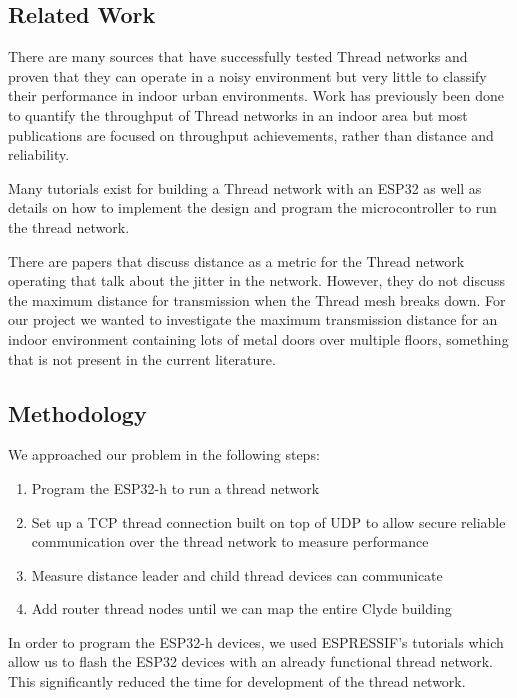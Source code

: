 \documentclass[letterpaper,twocolumn,10pt]{article}
\begin{document}
\subsection*{Related Work}

There are many sources that have successfully tested Thread networks and proven that they can operate in a noisy environment \cite*{Thread_noisy_env} but very little to classify their performance in indoor urban environments. Work has previously been done to quantify the throughput of Thread networks in an indoor area \cite*{Thread_on_drones} \cite*{Thread_lightbulb} but most publications are focused on throughput achievements, rather than distance and reliability.

Many tutorials exist for building a Thread network with an ESP32 \cite*{Thread_tutorial} as well as details on how to implement the design and program the microcontroller \cite*{Thread_tutorial_2} to run the thread network.  

There are papers that discuss distance as a metric for the Thread network operating \cite*{Thread_wheelchair} that talk about the jitter in the network. However, they do not discuss the maximum distance for transmission when the Thread mesh breaks down. For our project we wanted to investigate the maximum transmission distance for an indoor environment containing lots of metal doors over multiple floors, something that is not present in the current literature. 

\subsection*{Methodology}

We approached our problem in the following steps: 
\begin{enumerate}
    \item Program the ESP32-h to run a thread network
    \item Set up a TCP thread connection built on top of UDP to allow secure reliable communication over the thread network to measure performance
    \item Measure distance leader and child thread devices can communicate
    \item Add router thread nodes until we can map the entire Clyde building
\end{enumerate}

In order to program the ESP32-h devices, we used ESPRESSIF's tutorials which allow us to flash the ESP32 devices with an already functional thread network. This significantly reduced the time for development of the thread network. 
\end{document}
